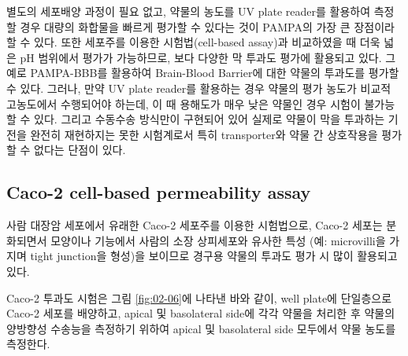 \documentclass[
  11pt,
  krantz2, a4paper, twoside]{krantz}
\begin{document}
별도의 세포배양 과정이 필요 없고, 약물의 농도를 UV plate reader를
활용하여 측정할 경우 대량의 화합물을 빠르게 평가할 수 있다는 것이
PAMPA의 가장 큰 장점이라 할 수 있다. 또한 세포주를 이용한
시험법(cell-based assay)과 비교하였을 때 더욱 넓은 pH 범위에서 평가가
가능하므로, 보다 다양한 막 투과도 평가에 활용되고 있다. 그 예로
PAMPA-BBB를 활용하여 Brain-Blood Barrier에 대한 약물의 투과도를 평가할
수 있다. 그러나, 만약 UV plate reader를 활용하는 경우 약물의 평가 농도가
비교적 고농도에서 수행되어야 하는데, 이 때 용해도가 매우 낮은 약물인
경우 시험이 불가능할 수 있다. 그리고 수동수송 방식만이 구현되어 있어
실제로 약물이 막을 투과하는 기전을 완전히 재현하지는 못한 시험계로서
특히 transporter와 약물 간 상호작용을 평가할 수 없다는 단점이 있다.

\subsection{Caco-2 cell-based permeability assay}\label{caco-2-cell-based-permeability-assay}

사람 대장암 세포에서 유래한 Caco-2 세포주를 이용한 시험법으로, Caco-2
세포는 분화되면서 모양이나 기능에서 사람의 소장 상피세포와 유사한 특성
(예: microvilli을 가지며 tight junction을 형성)을 보이므로 경구용 약물의
투과도 평가 시 많이 활용되고 있다.

Caco-2 투과도 시험은 그림 \ref{fig:02-06}에 나타낸 바와 같이, well
plate에 단일층으로 Caco-2 세포를 배양하고, apical 및 basolateral side에
각각 약물을 처리한 후 약물의 양방향성 수송능을 측정하기 위하여 apical 및
basolateral side 모두에서 약물 농도를 측정한다.
\end{document}
